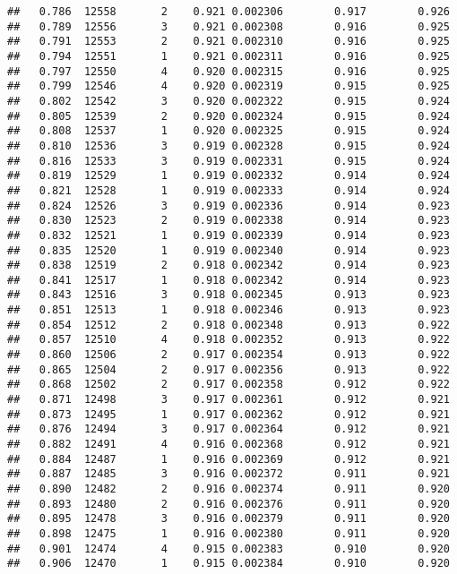 \documentclass[
]{book}
\begin{document}
\begin{verbatim}
##   0.786  12558       2    0.921 0.002306        0.917        0.926
##   0.789  12556       3    0.921 0.002308        0.916        0.925
##   0.791  12553       2    0.921 0.002310        0.916        0.925
##   0.794  12551       1    0.921 0.002311        0.916        0.925
##   0.797  12550       4    0.920 0.002315        0.916        0.925
##   0.799  12546       4    0.920 0.002319        0.915        0.925
##   0.802  12542       3    0.920 0.002322        0.915        0.924
##   0.805  12539       2    0.920 0.002324        0.915        0.924
##   0.808  12537       1    0.920 0.002325        0.915        0.924
##   0.810  12536       3    0.919 0.002328        0.915        0.924
##   0.816  12533       3    0.919 0.002331        0.915        0.924
##   0.819  12529       1    0.919 0.002332        0.914        0.924
##   0.821  12528       1    0.919 0.002333        0.914        0.924
##   0.824  12526       3    0.919 0.002336        0.914        0.923
##   0.830  12523       2    0.919 0.002338        0.914        0.923
##   0.832  12521       1    0.919 0.002339        0.914        0.923
##   0.835  12520       1    0.919 0.002340        0.914        0.923
##   0.838  12519       2    0.918 0.002342        0.914        0.923
##   0.841  12517       1    0.918 0.002342        0.914        0.923
##   0.843  12516       3    0.918 0.002345        0.913        0.923
##   0.851  12513       1    0.918 0.002346        0.913        0.923
##   0.854  12512       2    0.918 0.002348        0.913        0.922
##   0.857  12510       4    0.918 0.002352        0.913        0.922
##   0.860  12506       2    0.917 0.002354        0.913        0.922
##   0.865  12504       2    0.917 0.002356        0.913        0.922
##   0.868  12502       2    0.917 0.002358        0.912        0.922
##   0.871  12498       3    0.917 0.002361        0.912        0.921
##   0.873  12495       1    0.917 0.002362        0.912        0.921
##   0.876  12494       3    0.917 0.002364        0.912        0.921
##   0.882  12491       4    0.916 0.002368        0.912        0.921
##   0.884  12487       1    0.916 0.002369        0.912        0.921
##   0.887  12485       3    0.916 0.002372        0.911        0.921
##   0.890  12482       2    0.916 0.002374        0.911        0.920
##   0.893  12480       2    0.916 0.002376        0.911        0.920
##   0.895  12478       3    0.916 0.002379        0.911        0.920
##   0.898  12475       1    0.916 0.002380        0.911        0.920
##   0.901  12474       4    0.915 0.002383        0.910        0.920
##   0.906  12470       1    0.915 0.002384        0.910        0.920

\end{verbatim}
\end{document}
